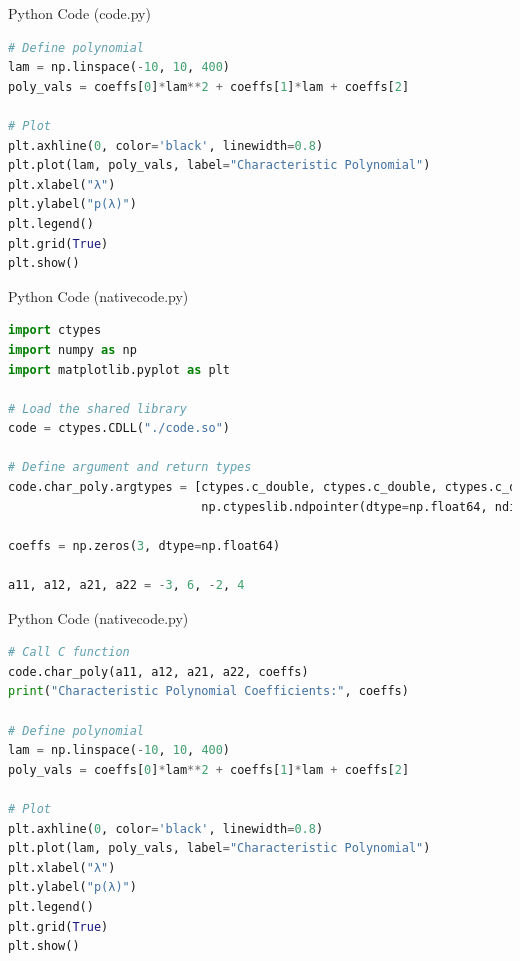 \documentclass{beamer}
\begin{document}
\begin{frame}[fragile]{Python Code (code.py)}
\begin{lstlisting}[language=Python]
# Define polynomial
lam = np.linspace(-10, 10, 400)
poly_vals = coeffs[0]*lam**2 + coeffs[1]*lam + coeffs[2]

# Plot
plt.axhline(0, color='black', linewidth=0.8)
plt.plot(lam, poly_vals, label="Characteristic Polynomial")
plt.xlabel("λ")
plt.ylabel("p(λ)")
plt.legend()
plt.grid(True)
plt.show()
\end{lstlisting}
\end{frame}


\begin{frame}[fragile]{Python Code (nativecode.py)}
\begin{lstlisting}[language=Python]
import ctypes
import numpy as np
import matplotlib.pyplot as plt

# Load the shared library
code = ctypes.CDLL("./code.so")

# Define argument and return types
code.char_poly.argtypes = [ctypes.c_double, ctypes.c_double, ctypes.c_double, ctypes.c_double,
                           np.ctypeslib.ndpointer(dtype=np.float64, ndim=1, flags="C")]

coeffs = np.zeros(3, dtype=np.float64)

a11, a12, a21, a22 = -3, 6, -2, 4
\end{lstlisting}
\end{frame}
\begin{frame}[fragile]{Python Code (nativecode.py)}
\begin{lstlisting}[language=Python]
# Call C function
code.char_poly(a11, a12, a21, a22, coeffs)
print("Characteristic Polynomial Coefficients:", coeffs)

# Define polynomial
lam = np.linspace(-10, 10, 400)
poly_vals = coeffs[0]*lam**2 + coeffs[1]*lam + coeffs[2]

# Plot
plt.axhline(0, color='black', linewidth=0.8)
plt.plot(lam, poly_vals, label="Characteristic Polynomial")
plt.xlabel("λ")
plt.ylabel("p(λ)")
plt.legend()
plt.grid(True)
plt.show()

\end{lstlisting}
\end{frame}
\end{document}
